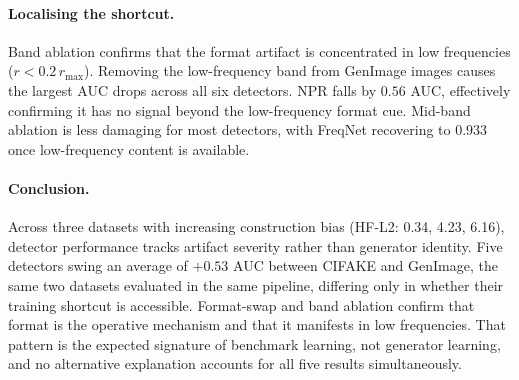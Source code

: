 \documentclass{bmvc2k}
\begin{document}
\paragraph{Localising the shortcut.}
Band ablation confirms that the format artifact is concentrated in low frequencies ($r < 0.2\,r_{\max}$). Removing the low-frequency band from GenImage images causes the largest AUC drops across all six detectors. NPR falls by $0.56$ AUC, effectively confirming it has no signal beyond the low-frequency format cue. Mid-band ablation is less damaging for most detectors, with FreqNet recovering to $0.933$ once low-frequency content is available.

\paragraph{Conclusion.}
Across three datasets with increasing construction bias (HF-L2: 0.34, 4.23, 6.16), detector performance tracks artifact severity rather than generator identity. Five detectors swing an average of $+0.53$ AUC between CIFAKE and GenImage, the same two datasets evaluated in the same pipeline, differing only in whether their training shortcut is accessible. Format-swap and band ablation confirm that format is the operative mechanism and that it manifests in low frequencies. That pattern is the expected signature of benchmark learning, not generator learning, and no alternative explanation accounts for all five results simultaneously.


\end{document}
